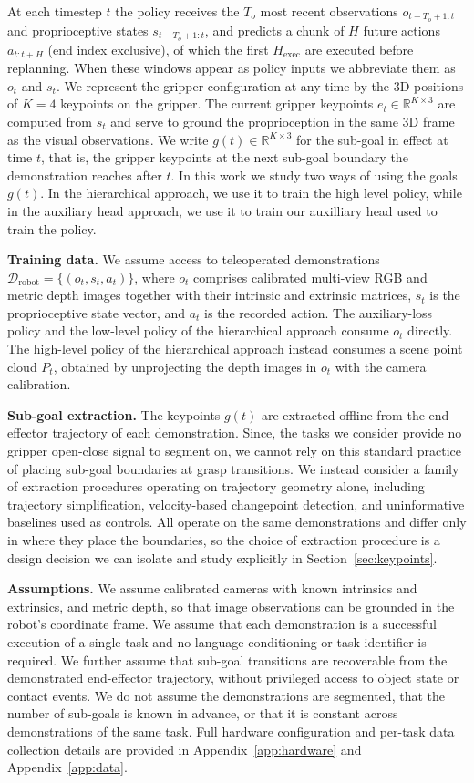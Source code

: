 \documentclass[letterpaper, 10 pt, conference]{ieeeconf}  %
\begin{document}
At each timestep $t$ the policy receives the $T_o$ most recent observations $o_{t-T_o+1:t}$ and proprioceptive states $s_{t-T_o+1:t}$, and predicts a chunk of $H$ future actions $a_{t:t+H}$ (end index exclusive), of which the first $H_{\text{exec}}$ are executed before replanning. When these windows appear as policy inputs we abbreviate them as $o_t$ and $s_t$. We represent the gripper configuration at any time by the 3D positions of $K{=}4$ keypoints on the gripper. The current gripper keypoints $e_t\in\mathbb{R}^{K\times 3}$ are computed from $s_t$ and serve to ground the proprioception in the same 3D frame as the visual observations. We write $g(t)\in\mathbb{R}^{K\times 3}$ for the sub-goal in effect at time $t$, that is, the gripper keypoints at the next sub-goal boundary the demonstration reaches after $t$. In this work we study two ways of using the goals $g(t)$. In the hierarchical approach, we use it to train the high level policy, while in the auxiliary head approach, we use it to train our auxilliary head used to train the policy.

\textbf{Training data.} We assume access to teleoperated demonstrations $\mathcal{D}_{\text{robot}} = \{(o_t, s_t, a_t)\}$, where $o_t$ comprises calibrated multi-view RGB and metric depth images together with their intrinsic and extrinsic matrices, $s_t$ is the proprioceptive state vector, and $a_t$ is the recorded action. The auxiliary-loss policy and the low-level policy of the hierarchical approach consume $o_t$ directly. The high-level policy of the hierarchical approach instead consumes a scene point cloud $P_t$, obtained by unprojecting the depth images in $o_t$ with the camera calibration.

\textbf{Sub-goal extraction.} The keypoints $g(t)$ are extracted offline from the end-effector trajectory of each demonstration. Since, the tasks we consider provide no gripper open-close signal to segment on, we cannot rely on this standard practice of placing sub-goal boundaries at grasp transitions. We instead consider a family of extraction procedures operating on trajectory geometry alone, including trajectory simplification, velocity-based changepoint detection, and uninformative baselines used as controls. All operate on the same demonstrations and differ only in where they place the boundaries, so the choice of extraction procedure is a design decision we can isolate and study explicitly in Section~\ref{sec:keypoints}.


\textbf{Assumptions.} We assume calibrated cameras with known intrinsics and extrinsics, and metric depth, so that image observations can be grounded in the robot's coordinate frame. We assume that each demonstration is a successful execution of a single task and no language conditioning or task identifier is required. We further assume that sub-goal transitions are recoverable from the demonstrated end-effector trajectory, without privileged access to object state or contact events. We do not assume the demonstrations are segmented, that the number of sub-goals is known in advance, or that it is constant across demonstrations of the same task. Full hardware configuration and per-task data collection details are provided in Appendix~\ref{app:hardware} and Appendix~\ref{app:data}.
\end{document}
